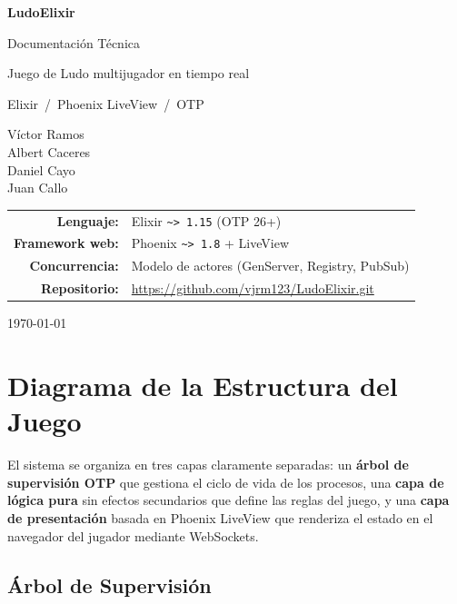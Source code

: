 \documentclass[11pt,a4paper]{article}
\begin{document}
\begin{titlepage}
  \centering
  \vspace*{3cm}
  {\Huge\bfseries LudoElixir\par}
  \vspace{0.6cm}
  {\Large Documentación Técnica\par}
  \vspace{0.4cm}
  {\large Juego de Ludo multijugador en tiempo real\par}
  \vspace{0.2cm}
  {\large Elixir~/~Phoenix LiveView~/~OTP\par}
  \vspace{0.6cm}
  {\large
  Víctor Ramos \\[2pt]
  Albert Caceres \\[2pt]
  Daniel Cayo \\[2pt]
  Juan Callo
  \par}
  \vfill
  \begin{tabular}{rl}
    \textbf{Lenguaje:}     & Elixir \texttt{\textasciitilde{}> 1.15} (OTP 26+) \\
    \textbf{Framework web:} & Phoenix \texttt{\textasciitilde{}> 1.8} + LiveView \\
    \textbf{Concurrencia:}  & Modelo de actores (GenServer, Registry, PubSub) \\
    \textbf{Repositorio:}   & \url{https://github.com/vjrm123/LudoElixir.git} \\
  \end{tabular}
  \vfill
  {\large \today\par}
\end{titlepage}

\tableofcontents
\newpage

\section{Diagrama de la Estructura del Juego}

El sistema se organiza en tres capas claramente separadas: un \textbf{árbol de
supervisión OTP} que gestiona el ciclo de vida de los procesos, una
\textbf{capa de lógica pura} sin efectos secundarios que define las reglas
del juego, y una \textbf{capa de presentación} basada en Phoenix LiveView
que renderiza el estado en el navegador del jugador mediante WebSockets.

\subsection{Árbol de Supervisión}
\end{document}

